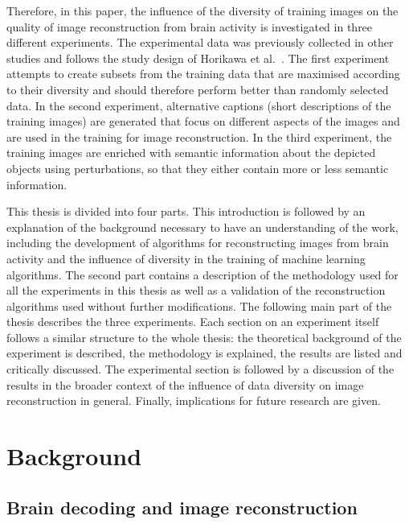 Therefore, in this paper, the influence of the diversity of training images on the quality of image reconstruction from brain activity is investigated in three different experiments. The experimental data was previously collected in other studies and follows the study design of Horikawa et al.~\cite{horikawaGenericDecodingSeen2017}. The first experiment attempts to create subsets from the training data that are maximised according to their diversity and should therefore perform better than randomly selected data. In the second experiment, alternative captions (short descriptions of the training images) are generated that focus on different aspects of the images and are used in the training for image reconstruction. In the third experiment, the training images are enriched with semantic information about the depicted objects using perturbations, so that they either contain more or less semantic information.

This thesis is divided into four parts. This introduction is followed by an explanation of the background necessary to have an understanding of the work, including the development of algorithms for reconstructing images from brain activity and the influence of diversity in the training of machine learning algorithms. The second part contains a description of the methodology used for all the experiments in this thesis as well as a validation of the reconstruction algorithms used without further modifications. The following main part of the thesis describes the three experiments. Each section on an experiment itself follows a similar structure to the whole thesis: the theoretical background of the experiment is described, the methodology is explained, the results are listed and critically discussed. The experimental section is followed by a discussion of the results in the broader context of the influence of data diversity on image reconstruction in general. Finally, implications for future research are given.


\section{Background}

\subsection{Brain decoding and image reconstruction}

